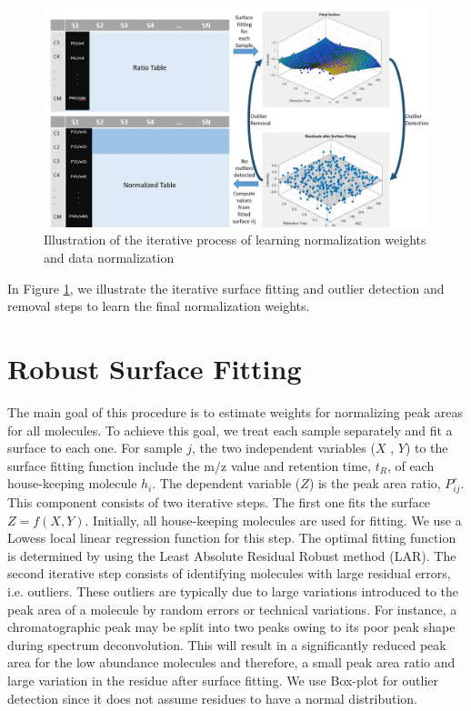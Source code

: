 \begin{figure}
	
	\centering
	\includegraphics[width=1.1\textwidth]{second_step}
	\caption{Illustration of the iterative process of learning normalization weights and data normalization}
	\label{second_step}
\end{figure}

In Figure \ref{second_step}, we illustrate the iterative surface fitting and outlier detection and removal steps to learn the final normalization weights. 


\section{Robust Surface Fitting}

The main goal of this procedure is to estimate weights for normalizing peak areas for all molecules. To achieve this goal, we treat each sample separately and fit a surface to each one. For sample $j$, the two independent variables ($X$ , $Y$) to the surface fitting function include the m/z value and retention time, $t_R$, of each house-keeping molecule $h_i$. The dependent variable ($Z$) is the peak area ratio, $P^r_{ij}$. This component consists of two iterative steps. The first one fits the surface $ Z= f(X,Y)$. Initially, all house-keeping molecules are used for fitting. We use a Lowess local linear regression function for this step. The optimal fitting function is determined by using the Least Absolute Residual Robust method (LAR). The second iterative step consists of identifying molecules with large residual errors, i.e. outliers. These outliers are typically due to large variations introduced to the peak area of a molecule by random errors or technical variations. For instance, a chromatographic peak may be split into two peaks owing to its poor peak shape during spectrum deconvolution. This will result in a significantly reduced peak area for the low abundance molecules and therefore, a small peak area ratio and large variation in the residue after surface fitting. We use Box-plot for outlier detection since it does not assume residues to have a normal distribution.

